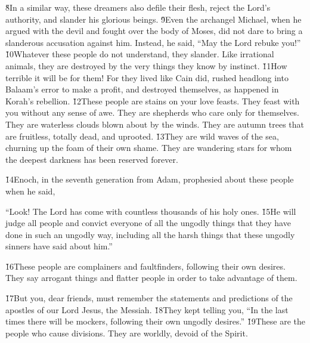 \v{8}In a similar way, these dreamers also defile their flesh, reject the Lord's authority, and slander his glorious beings. \v{9}Even the archangel Michael, when he argued with the devil and fought over the body of Moses, did not dare to bring a slanderous accusation against him. Instead, he said, ``May the Lord rebuke you!'' \v{10}Whatever these people do not understand, they slander. Like irrational animals, they are destroyed by the very things they know by instinct. \v{11}How terrible it will be for them! For they lived like Cain did, rushed headlong into Balaam's error to make a profit, and destroyed themselves, as happened in Korah's rebellion. \v{12}These people are stains on your love feasts. They feast with you without any sense of awe. They are shepherds who care only for themselves. They are waterless clouds blown about by the winds. They are autumn trees that are fruitless, totally dead, and uprooted. \v{13}They are wild waves of the sea, churning up the foam of their own shame. They are wandering stars for whom the deepest darkness has been reserved forever.

\v{14}Enoch, in the seventh generation from Adam, prophesied about these people when he said,

\begin{poetry}
\poeml ``Look! The Lord has come with countless thousands of his holy ones. \v{15}He will judge all people and convict everyone of all the ungodly things that they have done in such an ungodly way, including all the harsh things that these ungodly sinners have said about him.''
\end{poetry}

\v{16}These people are complainers and faultfinders, following their own desires. They say arrogant things and flatter people in order to take advantage of them.

\v{17}But you, dear friends, must remember the statements and predictions of the apostles of our Lord Jesus, the Messiah. \v{18}They kept telling you, ``In the last times there will be mockers, following their own ungodly desires.'' \v{19}These are the people who cause divisions. They are worldly, devoid of the Spirit.

